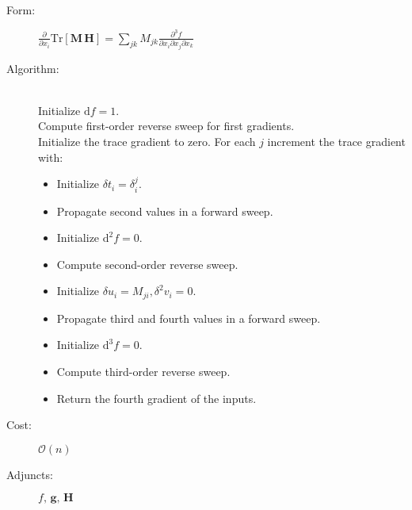 \begin{tcolorbox}[colback=white,colframe=gray90, coltitle=black,boxrule=3pt,
fonttitle=\bfseries,title=Gradient of the Trace of a Matrix Hessian Product]
	
	\begin{description}
		\item[Form:] 
		$\displaystyle \frac{\partial}{\partial x_{i} } \mathrm{Tr} \! \left[ \mathbf{M} \, \mathbf{H} \right]
		= \sum_{jk} M_{jk} \frac{ \partial^{3} f }{ \partial x_{i}  \partial x_{j}  \partial x_{k} } $
		\item[Algorithm:] \hfill \\
		Initialize $\mathrm{d} f = 1$. \\
		Compute first-order reverse sweep for first gradients. \\
		Initialize the trace gradient to zero.
		For each $j$ increment the trace gradient with:
		\begin{itemize}
			\setlength{\itemsep}{0cm}
			\setlength{\parskip}{0cm}
			\item[] Initialize $\delta t_{i} = \delta^{j}_{i}$.
			\item[] Propagate second values in a forward sweep. 
			\item[] Initialize $\mathrm{d}^{2} f = 0$.
			\item[] Compute second-order reverse sweep.
			\item[] Initialize $\delta u_{i} = M_{ji}, \delta^{2} v_{i} = 0$.
			\item[] Propagate third and fourth values in a  forward sweep.
			\item[] Initialize $\mathrm{d}^{3} f = 0$.
			\item[] Compute third-order reverse sweep.
			\item[] Return the fourth gradient of the inputs.
		\end{itemize}
		\item[Cost:] $\mathcal{O} \! \left( n \right)$
		\item[Adjuncts:] $ f, \, \mathbf{g}, \, \mathbf{H}$
	\end{description}
	
\end{tcolorbox}
